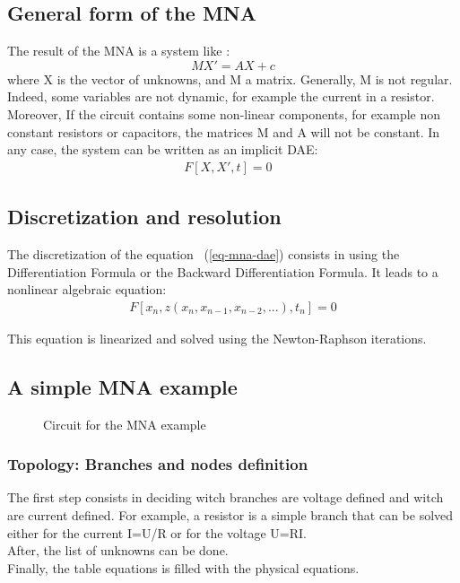 \subsection{General form of the MNA}
The result of the MNA is a system like :
\[MX'=AX+c\]
where X is the vector of unknowns, and M a matrix. Generally, M is not regular. Indeed, some variables
are not dynamic, for example the current in a resistor.
Moreover, If the circuit contains some non-linear components, for example non constant resistors or capacitors,
the matrices M and A will not be constant. In any case, the system can be written as an implicit DAE:
\begin{eqnarray}
F[X,X',t]=0&\label{eq-mna-dae}
\end{eqnarray}

\subsection {Discretization and resolution}

The discretization of the equation ~(\ref{eq-mna-dae}) consists in using the Differentiation Formula
or the Backward Differentiation Formula. It leads to a nonlinear algebraic equation:
\begin{eqnarray}
F[x_{n},z(x_{n},x_{n-1},x_{n-2},...),t_{n}]=0
\end{eqnarray}

This equation is linearized and solved using the Newton-Raphson iterations.

\newpage
\subsection{A simple MNA example}
\begin{figure}[h]
\centerline{
 \scalebox{0.6}{
    
 }
}
\caption{Circuit for the MNA example}
\label{fig-MNA-example}
\end{figure}
\subsubsection{Topology: Branches and nodes definition}
The first step consists in deciding witch branches are voltage defined and witch are current
defined. For example, a resistor is a simple branch that can be solved either for the current I=U/R or for the
voltage U=RI. \\
After, the list of unknowns can be done. \\
Finally, the table equations is filled with the physical equations. 

